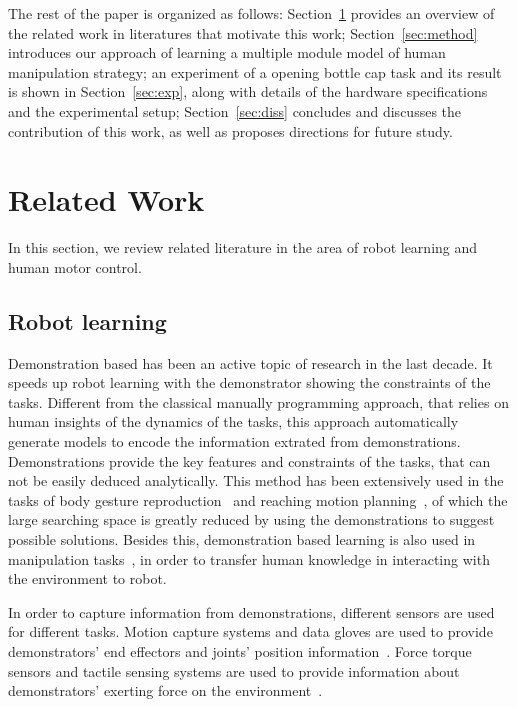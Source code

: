 \documentclass[preprint,12pt]{elsarticle}
\begin{document}
The rest of the paper is organized as follows: Section~\ref{sec:related} provides an overview of the related work in literatures that motivate this work; Section~\ref{sec:method} introduces our approach of learning a multiple module model of human manipulation strategy; an experiment of a opening bottle cap task and its result is shown in Section~\ref{sec:exp}, along with details of the hardware specifications and the experimental setup; Section~\ref{sec:diss} concludes and discusses the contribution of this work, as well as proposes directions for future study.

\section{Related Work}
\label{sec:related}
In this section, we review related literature in the area of robot learning and human motor control.


\subsection{Robot learning}
\label{sec:imitation}
Demonstration based has been an active topic of research in the last decade. It speeds up robot learning with the demonstrator showing the constraints of the tasks.
Different from the classical manually programming approach, that relies on human insights of the dynamics of the tasks, this approach automatically generate models to encode the information extrated from demonstrations. Demonstrations provide the key features and constraints of the tasks, that can not be easily deduced analytically. This method has been extensively used in the tasks of body gesture reproduction~\cite{hsiao2005imitation,calinon2010learning,kulic2012incremental} and reaching motion planning~\cite{Ekvall07,shukla2012coupled,mohammad2014learning}, of which the large searching space is greatly reduced by using the demonstrations to suggest possible solutions. Besides this, demonstration based learning is also used in manipulation tasks~\cite{petkos2006learning,sauser2011iterative,Miao2014}, in order to transfer human knowledge in interacting with the environment to robot.

In order to capture information from demonstrations, different sensors are used for different tasks. Motion capture systems and data gloves are used to provide demonstrators' end effectors and joints' position information~\cite{calinon2007incremental,asfour2008imitation,kulic2012incremental,bidan2013robio}. Force torque sensors and tactile sensing systems are used to provide information about demonstrators' exerting force on the environment~\cite{sauser2011iterative,Miao2014}. 
\end{document}
